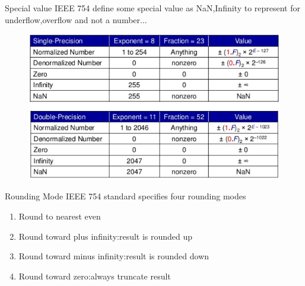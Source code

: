 \documentclass[11pt]{beamer}
\begin{document}
\begin{frame}[t]{Special value}
IEEE 754 define some special value as NaN,Infinity to represent for underflow,overflow and not a number...\begin{center}
    \begin{figure}[htp]
    \begin{center}
     \includegraphics[scale=.5]{image/fig25}
    \end{center}
    \label{reffig25}
    \end{figure}
\end{center}
\end{frame}
\begin{frame}[t]{Rounding Mode}
IEEE 754 standard specifies four rounding modes
\begin{enumerate}
\item Round to nearest even
\item Round toward plus infinity:result is rounded up
\item Round toward minus infinity:result is rounded down
\item Round toward zero:always truncate result
\end{enumerate}
\end{frame}
\end{document}
